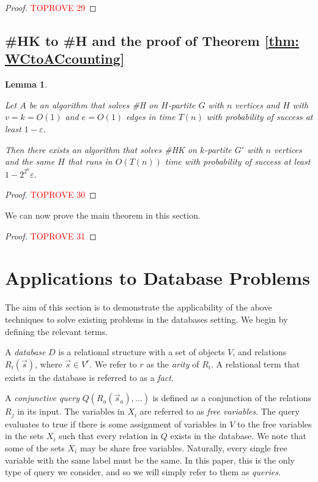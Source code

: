 \documentclass[11pt,letterpaper,pdftex]{article}
\newtheorem{lemma}[theorem]{Lemma}
\begin{document}
\begin{proof}\textcolor{red}{TOPROVE 29}\end{proof}

\subsection{\#HK to \#H and the proof of Theorem \ref{thm: WCtoACcounting}}

\begin{lemma}\label{lem: HK to H}

Let $A$ be an algorithm that solves \#H on $H$-partite $G$ with $n$ vertices and $H$ with $v = k = O(1)$ and $e = O(1)$ edges in time $T(n)$ with probability of success at least $1-\varepsilon$.

Then there exists an algorithm that solves \#HK on $k$-partite $G'$ with $n$ vertices and the same $H$ that runs in $O(T(n))$ time with probability of success at least $1 - 2^{2^k}\varepsilon$.

\end{lemma}
\begin{proof}\textcolor{red}{TOPROVE 30}\end{proof}


We can now prove the main theorem in this section.

\WCtoACcounting*

\begin{proof}\textcolor{red}{TOPROVE 31}\end{proof}





 
\section{Applications to Database Problems}
\label{sec:database}
The aim of this section is to demonstrate the applicability of the above techniques to solve existing problems in the databases setting. We begin by defining the relevant terms.

A \emph{database} $D$ is a relational structure with a set of objects $V$, and relations $R_i(\Vec s)$, where $\Vec s\in V^r$. We refer to $r$ as the \emph{arity} of $R_i$. A relational term that exists in the database is referred to as a \emph{fact}. 



A \emph{conjunctive query} $Q(R_a(\Vec s_a),...)$ is defined as a conjunction of the relations $R_j$ in its input. The variables in $X_i$ are referred to as \emph{free variables}. The query evaluates to true if there is some assignment of variables in $V$ to the free variables in the sets $X_i$ such that every relation in $Q$ exists in the database. We note that some of the sets $X_i$ may be share free variables. Naturally, every single free variable with the same label must be the same. In this paper, this is the only type of query we consider, and so we will simply refer to them as \emph{queries}.
\end{document}
